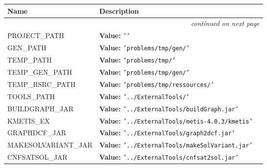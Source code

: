     \vspace{-1cm}
\hspace{\varindent}\begin{longtable}{|p{\varnamewidth}|p{\vardescrwidth}|l}
\cline{1-2}
\cline{1-2} \centering \textbf{Name} & \centering \textbf{Description}& \\
\cline{1-2}
\endhead\cline{1-2}\multicolumn{3}{r}{\small\textit{continued on next page}}\\\endfoot\cline{1-2}
\endlastfoot\raggedright P\-R\-O\-J\-E\-C\-T\-\_\-P\-A\-T\-H\- & \raggedright \textbf{Value:} 
{\tt \texttt{'}\texttt{}\texttt{'}}&\\
\cline{1-2}
\raggedright G\-E\-N\-\_\-P\-A\-T\-H\- & \raggedright \textbf{Value:} 
{\tt \texttt{'}\texttt{problems/tmp/gen/}\texttt{'}}&\\
\cline{1-2}
\raggedright T\-E\-M\-P\-\_\-P\-A\-T\-H\- & \raggedright \textbf{Value:} 
{\tt \texttt{'}\texttt{problems/tmp/}\texttt{'}}&\\
\cline{1-2}
\raggedright T\-E\-M\-P\-\_\-G\-E\-N\-\_\-P\-A\-T\-H\- & \raggedright \textbf{Value:} 
{\tt \texttt{'}\texttt{problems/tmp/gen/}\texttt{'}}&\\
\cline{1-2}
\raggedright T\-E\-M\-P\-\_\-R\-S\-R\-C\-\_\-P\-A\-T\-H\- & \raggedright \textbf{Value:} 
{\tt \texttt{'}\texttt{problems/tmp/ressources/}\texttt{'}}&\\
\cline{1-2}
\raggedright T\-O\-O\-L\-S\-\_\-P\-A\-T\-H\- & \raggedright \textbf{Value:} 
{\tt \texttt{'}\texttt{../ExternalTools/}\texttt{'}}&\\
\cline{1-2}
\raggedright B\-U\-I\-L\-D\-G\-R\-A\-P\-H\-\_\-J\-A\-R\- & \raggedright \textbf{Value:} 
{\tt \texttt{'}\texttt{../ExternalTools/buildGraph.jar}\texttt{'}}&\\
\cline{1-2}
\raggedright K\-M\-E\-T\-I\-S\-\_\-E\-X\- & \raggedright \textbf{Value:} 
{\tt \texttt{'}\texttt{../ExternalTools/metis-4.0.3/kmetis}\texttt{'}}&\\
\cline{1-2}
\raggedright G\-R\-A\-P\-H\-2\-D\-C\-F\-\_\-J\-A\-R\- & \raggedright \textbf{Value:} 
{\tt \texttt{'}\texttt{../ExternalTools/graph2dcf.jar}\texttt{'}}&\\
\cline{1-2}
\raggedright M\-A\-K\-E\-S\-O\-L\-V\-A\-R\-I\-A\-N\-T\-\_\-J\-A\-R\- & \raggedright \textbf{Value:} 
{\tt \texttt{'}\texttt{../ExternalTools/makeSolVariant.jar}\texttt{'}}&\\
\cline{1-2}
\raggedright C\-N\-F\-S\-A\-T\-2\-S\-O\-L\-\_\-J\-A\-R\- & \raggedright \textbf{Value:} 
{\tt \texttt{'}\texttt{../ExternalTools/cnfsat2sol.jar}\texttt{'}}&\\

\end{longtable}
